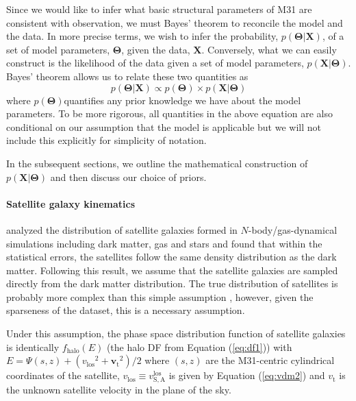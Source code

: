\documentclass[preprint]{aastex}
\newcommand{\eq}[1]{Equation (\ref{eq:#1})}
\newcommand{\bvec}[1]{\ensuremath{\boldsymbol{#1}}}
\renewcommand{\vector}[1]{\ensuremath{\bvec{#1}}}
\newcommand{\model}{\vector{\Theta}}
\newcommand{\data}{\vector{X}}
\newcommand{\prob}{\ensuremath{p}}
\newcommand{\probability}[2]{\ensuremath{\prob ( #1 | #2 )}}
\newcommand{\likelihood}{\probability{\data}{\model}}
\newcommand{\posterior}{\probability{\model}{\data}}
\newcommand{\prior}{\ensuremath{\prob (\model)}}
\newcommand{\df}{f}
\newcommand{\dfs}[1]{\df_\mathrm{#1}}
\newcommand{\dfhalo}{\dfs{halo}}
\newcommand{\E}{\ensuremath{E}}
\newcommand{\vlos}{\ensuremath{v_\mathrm{los}}}
\newcommand{\vt}{\ensuremath{\vector{v}_\mathrm{t}}}
\begin{document}
Since we would like to infer what basic structural parameters of M31 are consistent
with observation, we must Bayes' theorem to reconcile the model and the data.
In more precise terms, we wish to infer the probability, \posterior, of a set
of model parameters, \model, given the data, \data.  Conversely, what we can
easily construct is the likelihood of the data given a set of model parameters,
\likelihood.  Bayes' theorem allows us to relate these two quantities as
\begin{equation}
    \posterior \propto \prior \times \likelihood
\end{equation}
where \prior quantifies any prior knowledge we have about the model parameters.
To be more rigorous, all quantities in the above equation are also conditional
on our assumption that the model is applicable but we will not include this
explicitly for simplicity of notation.

In the subsequent sections, we outline the mathematical construction of \likelihood
and then discuss our choice of priors.

\paragraph{Satellite galaxy kinematics}

\citet{Sales:2007b} analyzed the distribution of satellite galaxies formed in
$N$-body/gas-dynamical simulations including dark matter, gas and stars and found
that within the statistical errors, the satellites follow the same density
distribution as the dark matter.  Following this result, we assume that the
satellite galaxies are sampled directly from the dark matter distribution.
The true distribution of satellites is probably more complex than this simple
assumption \citep[e.g.][]{Ibata:2007}, however, given the sparseness of the
dataset, this is a necessary assumption.

Under this assumption, the phase space distribution function of satellite galaxies
is identically $\dfhalo (\E)$ (the halo DF from \eq{df1}) with
$\E = \Psi (s,z) + \left ( \vlos^2 + \vt^2 \right )/2$ where
$(s,z)$ are the M31-centric cylindrical coordinates of the satellite,
$\vlos \equiv v_\mathrm{S,A}^\mathrm{los}$ is given by \eq{vdm2}
and $v_\mathrm{t}$ is the unknown satellite velocity in the plane of the sky.
\end{document}
